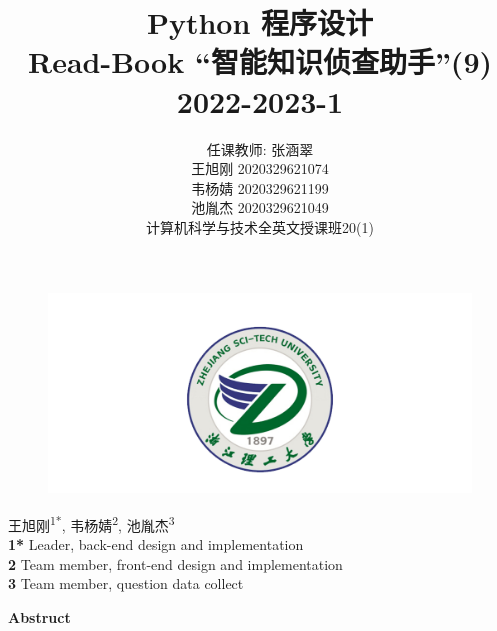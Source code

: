 \documentclass[twoside,11pt]{article}
\newcommand\studentName{\Large \centering 任课教师: 张涵翠\\王旭刚 2020329621074\\韦杨婧 2020329621199\\池胤杰 2020329621049\\计算机科学与技术全英文授课班20(1)\\}
\begin{document}
\begin{figure}[H]
    \centering
    \includegraphics[width=1\columnwidth]{figures/zstu-logo.png}
\end{figure}

\title{\Huge Python 程序设计\\ \vspace{1.5cm} Read-Book ``智能知识侦查助手''(9) \\ \vspace{1.5cm} \huge 2022-2023-1 \\ \vspace{0.8cm}}

\author{\name \studentName{}
    \addr
}

\maketitle
\thispagestyle{empty}
\newpage




\begin{center}
    王旭刚\textsuperscript{1*},
    韦杨婧\textsuperscript{2},
    池胤杰\textsuperscript{3}
    \\
    \bigskip
    \textbf{1*} Leader, back-end design and implementation
    \\
    \textbf{2} Team member, front-end design and implementation
    \\
    \textbf{3} Team member, question data collect
    \\
    \bigskip
\end{center}




\begin{center}
    \Large\textbf{Abstruct}
\end{center}
\end{document}
